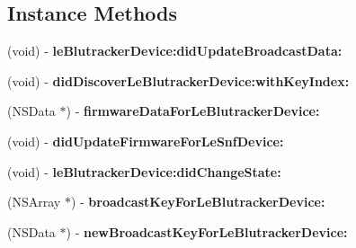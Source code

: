 \subsection*{Instance Methods}
\begin{DoxyCompactItemize}
\item 
\hypertarget{protocol_le_blutracker_device_delegate-p_a872ff9e7712985f3aad7b1a4f698902b}{}(void) -\/ {\bfseries le\+Blutracker\+Device\+:did\+Update\+Broadcast\+Data\+:}\label{protocol_le_blutracker_device_delegate-p_a872ff9e7712985f3aad7b1a4f698902b}

\item 
\hypertarget{protocol_le_blutracker_device_delegate-p_af7f3077c572b6a225241c1bfff4c6768}{}(void) -\/ {\bfseries did\+Discover\+Le\+Blutracker\+Device\+:with\+Key\+Index\+:}\label{protocol_le_blutracker_device_delegate-p_af7f3077c572b6a225241c1bfff4c6768}

\item 
\hypertarget{protocol_le_blutracker_device_delegate-p_ab68d7b478b2162f8fa3c2ed73b5b5ba3}{}(N\+S\+Data $\ast$) -\/ {\bfseries firmware\+Data\+For\+Le\+Blutracker\+Device\+:}\label{protocol_le_blutracker_device_delegate-p_ab68d7b478b2162f8fa3c2ed73b5b5ba3}

\item 
\hypertarget{protocol_le_blutracker_device_delegate-p_ac23b3ef1a2654c949bcd2abe85aaf103}{}(void) -\/ {\bfseries did\+Update\+Firmware\+For\+Le\+Snf\+Device\+:}\label{protocol_le_blutracker_device_delegate-p_ac23b3ef1a2654c949bcd2abe85aaf103}

\item 
\hypertarget{protocol_le_blutracker_device_delegate-p_a16b4df5fdfc54e45f27646d040cc789f}{}(void) -\/ {\bfseries le\+Blutracker\+Device\+:did\+Change\+State\+:}\label{protocol_le_blutracker_device_delegate-p_a16b4df5fdfc54e45f27646d040cc789f}

\item 
\hypertarget{protocol_le_blutracker_device_delegate-p_a4e632636e78449228fe9ceee7e15a59a}{}(N\+S\+Array $\ast$) -\/ {\bfseries broadcast\+Key\+For\+Le\+Blutracker\+Device\+:}\label{protocol_le_blutracker_device_delegate-p_a4e632636e78449228fe9ceee7e15a59a}

\item 
\hypertarget{protocol_le_blutracker_device_delegate-p_afb98dfb8a3cadb2d376c76b3335fbdc9}{}(N\+S\+Data $\ast$) -\/ {\bfseries new\+Broadcast\+Key\+For\+Le\+Blutracker\+Device\+:}\label{protocol_le_blutracker_device_delegate-p_afb98dfb8a3cadb2d376c76b3335fbdc9}


\end{DoxyCompactItemize}
